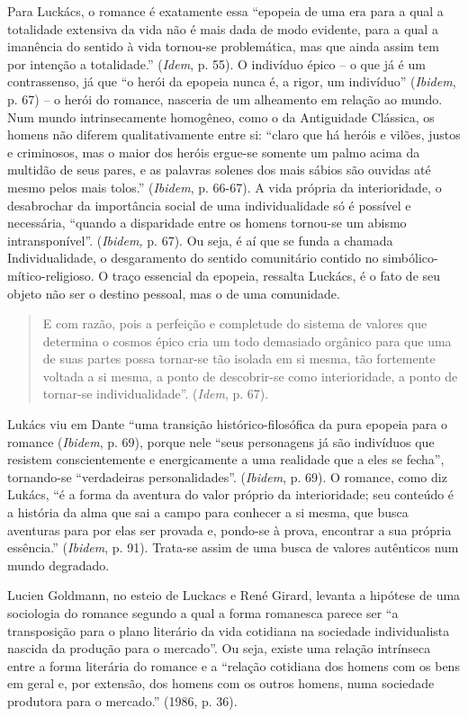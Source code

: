 Para Luckács, o romance é exatamente essa ``epopeia de uma era para a
qual a totalidade extensiva da vida não é mais dada de modo evidente,
para a qual a imanência do sentido à vida tornou-se problemática, mas
que ainda assim tem por intenção a totalidade.'' (\emph{Idem}, p. 55). O
indivíduo épico -- o que já é um contrassenso, já que ``o herói da
epopeia nunca é, a rigor, um indivíduo'' (\emph{Ibidem}, p. 67) -- o
herói do romance, nasceria de um alheamento em relação ao mundo. Num
mundo intrinsecamente homogêneo, como o da Antiguidade Clássica, os
homens não diferem qualitativamente entre si: ``claro que há heróis e
vilões, justos e criminosos, mas o maior dos heróis ergue-se somente um
palmo acima da multidão de seus pares, e as palavras solenes dos mais
sábios são ouvidas até mesmo pelos mais tolos.'' (\emph{Ibidem}, p.
66-67). A vida própria da interioridade, o desabrochar da importância
social de uma individualidade só é possível e necessária, ``quando a
disparidade entre os homens tornou-se um abismo intransponível''.
(\emph{Ibidem,} p. 67). Ou seja, é aí que se funda a chamada
Individualidade, o desgaramento do sentido comunitário contido no
simbólico-mítico-religioso. O traço essencial da epopeia, ressalta
Luckács, é o fato de seu objeto não ser o destino pessoal, mas o de uma
comunidade.

\begin{quote}
E com razão, pois a perfeição e completude do sistema de valores que
determina o cosmos épico cria um todo demasiado orgânico para que uma de
suas partes possa tornar-se tão isolada em si mesma, tão fortemente
voltada a si mesma, a ponto de descobrir-se como interioridade, a ponto
de tornar-se individualidade''. (\emph{Idem}, p. 67).
\end{quote}

Lukács viu em Dante ``uma transição histórico-filosófica da pura epopeia
para o romance (\emph{Ibidem}, p. 69), porque nele ``seus personagens já
são indivíduos que resistem conscientemente e energicamente a uma
realidade que a eles se fecha'', tornando-se ``verdadeiras
personalidades''. (\emph{Ibidem}, p. 69). O romance, como diz Lukács,
``é a forma da aventura do valor próprio da interioridade; seu conteúdo
é a história da alma que sai a campo para conhecer a si mesma, que busca
aventuras para por elas ser provada e, pondo-se à prova, encontrar a sua
própria essência.'' (\emph{Ibidem}, p. 91). Trata-se assim de uma busca
de valores autênticos num mundo degradado.

Lucien Goldmann, no esteio de Luckacs e René Girard, levanta a hipótese
de uma sociologia do romance segundo a qual a forma romanesca parece ser
``a transposição para o plano literário da vida cotidiana na sociedade
individualista nascida da produção para o mercado''. Ou seja, existe uma
relação intrínseca entre a forma literária do romance e a ``relação
cotidiana dos homens com os bens em geral e, por extensão, dos homens
com os outros homens, numa sociedade produtora para o mercado.'' (1986,
p. 36).

